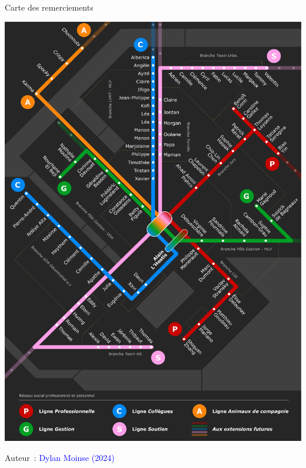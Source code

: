     \begin{carte}[h!]\vspace*{4pt}
        \caption*{Carte des remerciements}
        \label{fig-introduction:remerciements}
        \centerline{\includegraphics[width=1\columnwidth]{src/Figures/Preambule/FR_Remerciements.pdf}}
        \vspace{5pt}
        \begin{flushright}\scriptsize{
        Auteur~: \textcolor{blue}{Dylan Moinse (2024)}
        }\end{flushright}
    \end{carte}